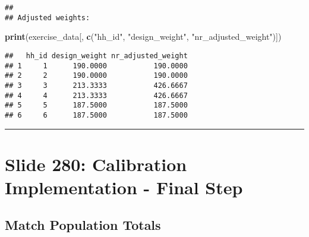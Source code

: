 \documentclass[
]{article}
\newenvironment{Shaded}{\begin{snugshade}}{\end{snugshade}}
\newcommand{\FunctionTok}[1]{\textcolor[rgb]{0.13,0.29,0.53}{\textbf{#1}}}
\newcommand{\NormalTok}[1]{#1}
\newcommand{\StringTok}[1]{\textcolor[rgb]{0.31,0.60,0.02}{#1}}
\begin{document}
\begin{verbatim}
## 
## Adjusted weights:
\end{verbatim}

\begin{Shaded}
\begin{Highlighting}[]
\FunctionTok{print}\NormalTok{(exercise\_data[, }\FunctionTok{c}\NormalTok{(}\StringTok{"hh\_id"}\NormalTok{, }\StringTok{"design\_weight"}\NormalTok{, }\StringTok{"nr\_adjusted\_weight"}\NormalTok{)])}
\end{Highlighting}
\end{Shaded}

\begin{verbatim}
##   hh_id design_weight nr_adjusted_weight
## 1     1      190.0000           190.0000
## 2     2      190.0000           190.0000
## 3     3      213.3333           426.6667
## 4     4      213.3333           426.6667
## 5     5      187.5000           187.5000
## 6     6      187.5000           187.5000
\end{verbatim}

\begin{center}\rule{0.5\linewidth}{0.5pt}\end{center}

\section{Slide 280: Calibration Implementation - Final
Step}\label{slide-280-calibration-implementation---final-step}

\subsection{Match Population Totals}\label{match-population-totals}
\end{document}
